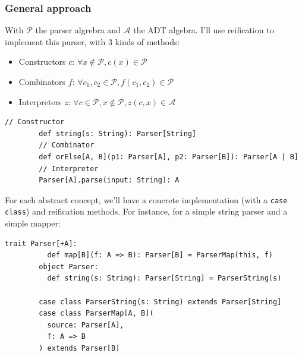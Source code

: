 \begin{frame}[fragile]
  \frametitle{General approach}

  \begin{overprint}
    With \(\mathcal{P}\) the parser algrebra and \(\mathcal{A}\) the ADT algebra. I'll use reification to implement this parser, with 3 kinds of methods:
    \begin{itemize}
      \item Constructors \(c\): \(\forall x \notin \mathcal{P}, c(x) \in \mathcal{P}\)
      \item Combinators \(f\): \(\forall c_1, c_2 \in \mathcal{P}, f(c_1, c_2) \in \mathcal{P}\)
      \item Interpreters \(z\): \(\forall c \in \mathcal{P}, x \notin \mathcal{P}, z(c, x) \in \mathcal{A}\)
    \end{itemize}

    \begin{example}
      \begin{lstlisting}[gobble=8]
        // Constructor
        def string(s: String): Parser[String]
        // Combinator
        def orElse[A, B](p1: Parser[A], p2: Parser[B]): Parser[A | B]
        // Interpreter
        Parser[A].parse(input: String): A
      \end{lstlisting}
    \end{example}

    For each abstract concept, we'll have a concrete implementation (with a \texttt{case class}) and reification methods. For instance, for a simple string parser and a simple mapper:

    \begin{example}
      \begin{lstlisting}[gobble=8]
        trait Parser[+A]:
          def map[B](f: A => B): Parser[B] = ParserMap(this, f)
        object Parser:
          def string(s: String): Parser[String] = ParserString(s)
      
        case class ParserString(s: String) extends Parser[String]
        case class ParserMap[A, B](
          source: Parser[A],
          f: A => B
        ) extends Parser[B]
      \end{lstlisting}
    \end{example}
  \end{overprint}
\end{frame}
